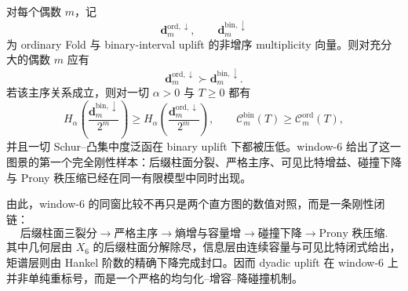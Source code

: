 \begin{conjecture}\label{conj:conclusion-even-window-ordinary-binary-majorization}
对每个偶数 \(m\)，记
\[
\mathbf d_m^{\mathrm{ord},\downarrow},
\qquad
\mathbf d_m^{\mathrm{bin},\downarrow}
\]
为 ordinary Fold 与 binary-interval uplift 的非增序 multiplicity 向量。则对充分大的偶数 \(m\) 应有
\[
\mathbf d_m^{\mathrm{ord},\downarrow}\succ \mathbf d_m^{\mathrm{bin},\downarrow}.
\]
若该主序关系成立，则对一切 \(\alpha>0\) 与 \(T\ge 0\) 都有
\[
H_\alpha\!\left(\frac{\mathbf d_m^{\mathrm{bin},\downarrow}}{2^m}\right)
\ge
H_\alpha\!\left(\frac{\mathbf d_m^{\mathrm{ord},\downarrow}}{2^m}\right),
\qquad
\mathcal C_m^{\mathrm{bin}}(T)\ge \mathcal C_m^{\mathrm{ord}}(T),
\]
并且一切 Schur--凸集中度泛函在 binary uplift 下都被压低。window-\(6\) 给出了这一图景的第一个完全刚性样本：后缀柱面分裂、严格主序、可见比特增益、碰撞下降与 Prony 秩压缩已经在同一有限模型中同时出现。
\end{conjecture}

\noindent
由此，window-\(6\) 的同窗比较不再只是两个直方图的数值对照，而是一条刚性闭链：
\[
\text{后缀柱面三裂分}
\longrightarrow
\text{严格主序}
\longrightarrow
\text{熵增与容量增}
\longrightarrow
\text{碰撞下降}
\longrightarrow
\text{Prony 秩压缩}.
\]
其中几何层由 \(X_6\) 的后缀柱面分解除尽，信息层由连续容量与可见比特闭式给出，矩谱层则由 Hankel 阶数的精确下降完成封口。因而 dyadic uplift 在 window-\(6\) 上并非单纯重标号，而是一个严格的均匀化--增容--降碰撞机制。
